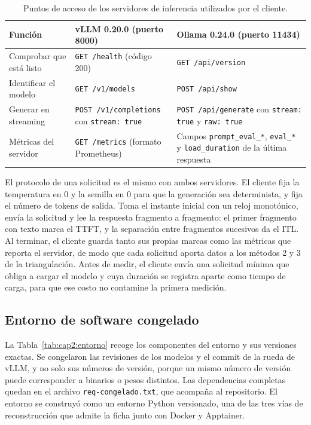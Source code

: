 \begin{table}[htbp]
  \centering
  \caption{Puntos de acceso de los servidores de inferencia utilizados por el cliente.}
  \label{tab:cap2:api}
  \footnotesize
  \begin{tabular}{|p{}|p{}|p{}|}
    \hline
    \textbf{Función} & \textbf{vLLM 0.20.0 (puerto 8000)} & \textbf{Ollama 0.24.0 (puerto 11434)} \\
    \hline
    Comprobar que está listo & \texttt{GET /health} (código 200) & \texttt{GET /api/version} \\
    \hline
    Identificar el modelo & \texttt{GET /v1/models} & \texttt{POST /api/show} \\
    \hline
    Generar en streaming & \texttt{POST /v1/completions} con \texttt{stream: true} & \texttt{POST /api/generate} con \texttt{stream: true} y \texttt{raw: true} \\
    \hline
    Métricas del servidor & \texttt{GET /metrics} (formato Prometheus) & Campos \texttt{prompt\_eval\_*}, \texttt{eval\_*} y \texttt{load\_duration} de la última respuesta \\
    \hline
  \end{tabular}
\end{table}

El protocolo de una solicitud es el mismo con ambos servidores. El cliente fija la temperatura en 0 y la semilla en 0 para que la generación sea determinista, y fija el número de tokens de salida. Toma el instante inicial con un reloj monotónico, envía la solicitud y lee la respuesta fragmento a fragmento: el primer fragmento con texto marca el TTFT, y la separación entre fragmentos sucesivos da el ITL. Al terminar, el cliente guarda tanto sus propias marcas como las métricas que reporta el servidor, de modo que cada solicitud aporta datos a los métodos 2 y 3 de la triangulación. Antes de medir, el cliente envía una solicitud mínima que obliga a cargar el modelo y cuya duración se registra aparte como tiempo de carga, para que ese costo no contamine la primera medición.

\subsection{Entorno de software congelado}
\label{sec:cap2:entorno}

La Tabla~\ref{tab:cap2:entorno} recoge los componentes del entorno y sus versiones exactas. Se congelaron las revisiones de los modelos y el commit de la rueda de vLLM, y no solo sus números de versión, porque un mismo número de versión puede corresponder a binarios o pesos distintos. Las dependencias completas quedan en el archivo \texttt{req-congelado.txt}, que acompaña al repositorio. El entorno se construyó como un entorno Python versionado, una de las tres vías de reconstrucción que admite la ficha junto con Docker y Apptainer.

